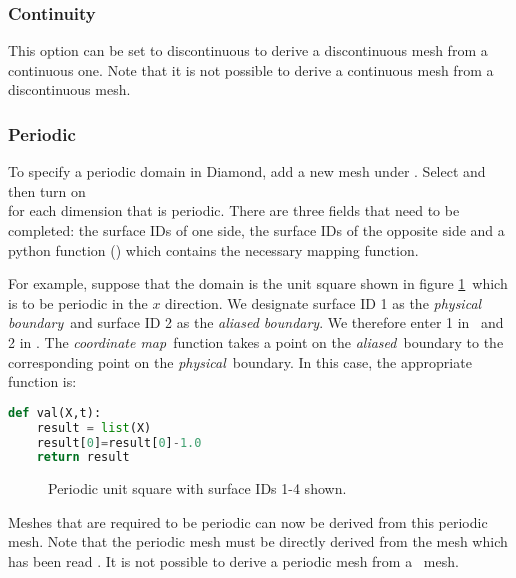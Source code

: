 \subsubsection{Continuity}

This option can be set to discontinuous to derive a discontinuous mesh from
a continuous one. Note that it is not possible to derive a continuous mesh
from a discontinuous mesh.

\subsubsection{Periodic}\label{sec:periodic}

To specify a periodic domain in Diamond, add a new mesh under
.  Select \onlypdf\linebreak
{} and then turn
on \onlypdf\\
 for each dimension
that is periodic. There are three fields that need to be completed: the
surface IDs of one side, the surface IDs of the opposite side and a python
function () which contains the necessary mapping
function.

For example, suppose that the domain is the unit square shown in figure
\ref{fig:periodic}\ which is to be periodic in the $x$ direction. We
designate surface ID 1 as the \emph{physical boundary}\ and surface ID 2 as the
\emph{aliased boundary}. We therefore enter 1 in
\ and 2 in
. The \emph{coordinate map}\ function
takes a point on the \emph{aliased}\ boundary to the corresponding point on
the \emph{physical}\ boundary. In this case, the appropriate function is:
\begin{lstlisting}[language=Python]
def val(X,t):
    result = list(X)
    result[0]=result[0]-1.0
    return result
\end{lstlisting}

\begin{figure}[ht]
  \centering
  \caption{Periodic unit square with surface IDs 1-4 shown.}
  \label{fig:periodic}
\end{figure}

Meshes that are required to be periodic can now be derived from this
periodic mesh. Note that the periodic mesh must be directly derived from the
mesh which has been read . It is not possible to derive a
periodic mesh from a \ mesh.

